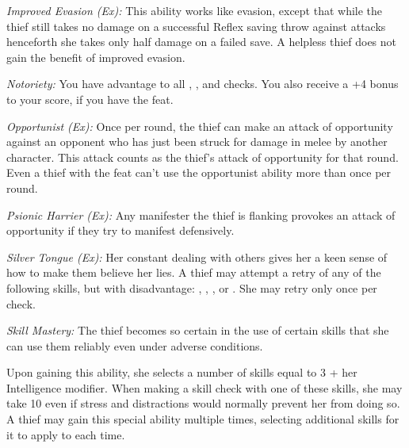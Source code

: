 \textit{Improved Evasion (Ex):} This ability works like evasion, except that while the thief still takes no damage on a successful Reflex saving throw against attacks henceforth she takes only half damage on a failed save. A helpless thief does not gain the benefit of improved evasion.



\textit{Notoriety:} You have advantage to all , , and  checks. You also receive a +4 bonus to your  score, if you have the  feat.

\textit{Opportunist (Ex):} Once per round, the thief can make an attack of opportunity against an opponent who has just been struck for damage in melee by another character. This attack counts as the thief's attack of opportunity for that round. Even a thief with the  feat can't use the opportunist ability more than once per round.

\textit{Psionic Harrier (Ex):} Any manifester the thief is flanking provokes an attack of opportunity if they try to manifest defensively.

\textit{Silver Tongue (Ex):} Her constant dealing with others gives her a keen sense of how to make them believe her lies. A thief may attempt a retry of any of the following skills, but with disadvantage: , , , or . She may retry only once per check.

\textit{Skill Mastery:} The thief becomes so certain in the use of certain skills that she can use them reliably even under adverse conditions.

Upon gaining this ability, she selects a number of skills equal to 3 + her Intelligence modifier. When making a skill check with one of these skills, she may take 10 even if stress and distractions would normally prevent her from doing so. A thief may gain this special ability multiple times, selecting additional skills for it to apply to each time.

